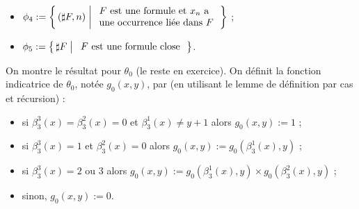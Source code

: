 \documentclass[./main]{subfiles}
\begin{document}
\begin{lem}
\begin{itemize}
     \item $\phi_4 := \mleft\{\,(\sharp F, n) \;\middle|\; \begin{array}{l} \text{$F$ est une formule et $x_n$ a}\\ \text{une occurrence liée dans $F$} \end{array} \,\mright\}$ ;
     \item $\phi_5 := \mleft\{\,\sharp F \;\middle|\; \begin{array}{l} \text{$F$ est une formule close} \end{array} \,\mright\}$.
   \end{itemize}
 \end{lem}
 \begin{prv}
   On montre le résultat pour $\theta_0$ (le reste en exercice).
   On définit la fonction indicatrice de $\theta_0$, notée  $g_0(x, y)$, par (en utilisant le lemme de définition par cas et récursion) :
    \begin{itemize}
     \item si $\beta_3^3(x) = \beta_3^2(x) = 0$ et  $\beta_3^1(x) \neq y + 1$ alors $g_0(x, y) := 1$ ;
     \item si $\beta_3^3(x) = 1$ et $\beta_3^2(x) = 0$ alors  $g_0(x,y) := g_0(\beta_3^1(x), y)$ ;
     \item si  $\beta_3^3(x) = 2\text{ ou } 3$ alors $g_0(x,y) := g_0(\beta_3^1(x), y) \times g_0(\beta_3^2(x), y)$ ;
     \item sinon, $g_0(x,y) := 0$.
   \end{itemize}
 \end{prv}
\end{document}
